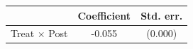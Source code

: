\begin{tabular}{lcc}
\toprule
 & Coefficient & Std. err. \\
\midrule
Treat $\times$ Post & -0.055 & (0.000) \\
\bottomrule
\end{tabular}
